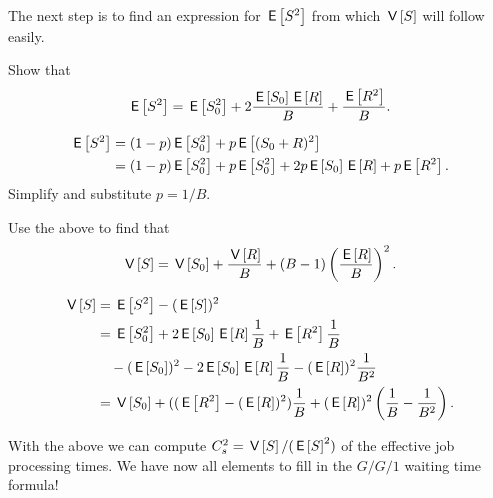 The next step is to find an expression for $\E{S^2}$ from which $\V{S}$ will follow easily.

\begin{exercise}[\faCalculator]
  Show that
  \begin{equation*}
    \E{S^2} = \E{S_0^2} + 2\frac{\E{S_0}\E{R}} B + \frac{\E{R^2}}B.
  \end{equation*}
  \begin{solution}
  \begin{align*}
    \E{S^2} 
&= (1-p) \E{S_0^2} + p \E{(S_0+R)^2}\\
&= (1-p) \E{S_0^2} + p \E{S_0^2}  + 2 p \E{S_0} \E R + p \E{R^2}. 
  \end{align*}
  Simplify and substitute $p=1/B$. 
  \end{solution}
\end{exercise}

\begin{exercise}[\faCalculator]
  Use the above to find that
  \begin{equation*}
    \V{S} = \V{S_0} + \frac{\V{R}} B + (B-1)\left(\frac{\E R}{B}\right)^2.
  \end{equation*}
  \begin{solution}
    \begin{equation*}
      \begin{split}
\V{S} 
&=\E{S^2} - (\E{S})^2 \\
&= \E{S_0^2} + 2 \E{S_0} \E R\frac 1B + \E{R^2}\frac 1B  \\
&\quad - (\E{S_0})^2 - 2\E{S_0}\E R \frac 1 B - (\E R)^2\frac1{B^2}\\
&=  \V{S_0} + ((\E{R^2} - (\E R)^2)\frac 1 B + (\E R)^2\left(\frac 1B - \frac 1{B^2}\right).
      \end{split}
    \end{equation*}
  \end{solution}
\end{exercise}

With the above we can compute $C_s^2=\V{S}/(\E{S}^2)$ of the effective job processing times. We have now all elements to fill in the $G/G/1$ waiting time formula!

